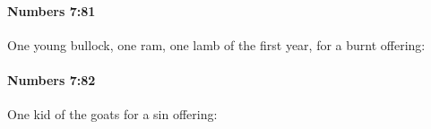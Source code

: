 		\paragraph{Numbers 7:81} %
			\label{NUMBERS-7-81}

			One young bullock, one ram, one lamb of the first year, for a burnt offering:


		\paragraph{Numbers 7:82} %
			\label{NUMBERS-7-82}

			One kid of the goats for a sin offering:


